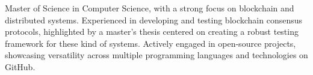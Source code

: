 \documentclass[a4paper,12pt]{article}
\begin{document}
Master of Science in Computer Science, with a strong focus on blockchain and distributed systems. Experienced in developing and testing blockchain consensus protocols, highlighted by a master's thesis centered on creating a robust testing framework for these kind of systems. Actively engaged in open-source projects, showcasing versatility across multiple programming languages  and technologies on GitHub.
\end{document}
